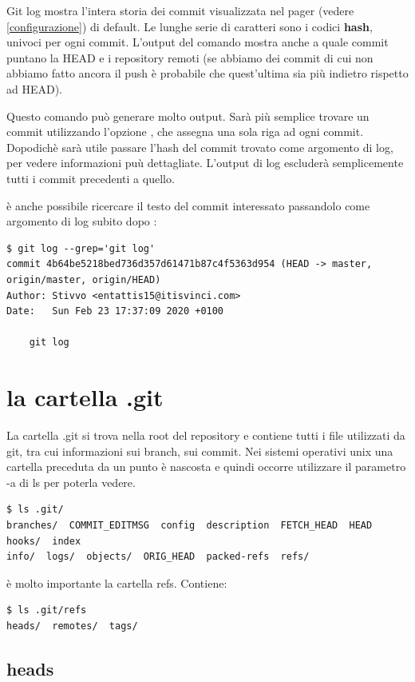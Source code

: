 \documentclass{article} \usepackage[textwidth=18cm,textheight=18cm]{geometry}
\begin{document}
Git log mostra l'intera storia dei commit visualizzata nel pager (vedere 
\ref{configurazione}) di default.
Le lunghe serie di caratteri sono i codici \textbf{hash}, univoci per ogni
commit. L'output del comando mostra anche a quale commit puntano la HEAD e i
repository remoti (se abbiamo dei commit di cui non abbiamo fatto ancora il push
è probabile che quest'ultima sia più indietro rispetto ad HEAD).

Questo comando può generare molto output. Sarà più semplice trovare un commit
utilizzando l'opzione , che assegna una sola
riga ad ogni commit. Dopodichè sarà utile passare l'hash del commit trovato come
argomento di log, per vedere informazioni puù dettagliate. L'output di log
escluderà semplicemente tutti i commit precedenti a quello.

è anche possibile ricercare il testo del commit interessato passandolo come
argomento di log subito dopo :

\begin{verbatim}
$ git log --grep='git log'
commit 4b64be5218bed736d357d61471b87c4f5363d954 (HEAD -> master, origin/master, origin/HEAD)
Author: Stivvo <entattis15@itisvinci.com>
Date:   Sun Feb 23 17:37:09 2020 +0100

    git log
\end{verbatim}

\section{la cartella .git}

La cartella .git si trova nella root del repository e contiene tutti i file
utilizzati da git, tra cui informazioni sui branch, sui commit. Nei sistemi
operativi unix una cartella preceduta da un punto è nascosta e quindi occorre
utilizzare il parametro -a di ls per poterla vedere.

\begin{verbatim}
$ ls .git/
branches/  COMMIT_EDITMSG  config  description  FETCH_HEAD  HEAD  hooks/  index  
info/  logs/  objects/  ORIG_HEAD  packed-refs  refs/
\end{verbatim}

è molto importante la cartella refs. Contiene:

\begin{verbatim}
$ ls .git/refs
heads/  remotes/  tags/
\end{verbatim}

\subsection{heads}
\end{document}
